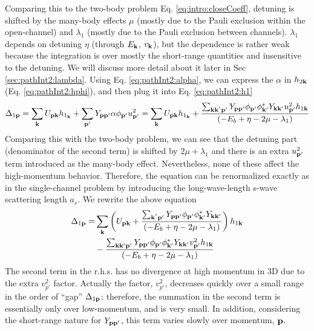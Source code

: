 Comparing this to the two-body problem Eq. \ref{eq:intro:closeCoeff}, detuning is shifted by the many-body effects $\mu$ (mostly due to the Pauli exclusion within the open-channel) and $\lambda_{1}$ (mostly due to the Pauli exclusion between channels). 
$\lambda_{1}$ depends on detuning $\eta$ (through $E_{\mathbf{k}}$, $v_{\mathbf{k}}$), but the dependence is rather weak because the integration is over mostly the short-range quantities and  insensitive to the detuning. We will discuss more detail about it later in Sec \ref{sec:pathInt2:lambda}. 
Using Eq. \ref{eq:pathInt2:alpha}, we can express the $\alpha$ in $h_{2\mathbf{k}}$ (Eq. \ref{eq:pathInt2:hphi}), and then plug it into Eq. \ref{eq:pathInt2:h1}
\begin{equation*}
\Delta_{1\mathbf{p}}=\sum_{\mathbf{k}}{}U_{\mathbf{p}\mathbf{k}}{h_{1_{\mathbf{k}}}}+
	{\sum_{\mathbf{p}'} Y_{\mathbf{p}\mathbf{p}'}\alpha{\phi_{\ensuremath{\mathbf{p}}'}}u_{\mathbf{p}'}^{2}}
				=\sum_{\mathbf{k}}{}U_{\mathbf{p}\mathbf{k}}{h_{1_{\mathbf{k}}}}+
	\frac{\sum_{\mathbf{k}\mathbf{k}^{'}\mathbf{p}'} Y_{\mathbf{p}\mathbf{p}'}{\phi_{\mathbf{p}'}}{\phi_{\mathbf{k}'}^{*}}{Y_{\mathbf{k}\mathbf{k}'}}u_{\mathbf{p}'}^{2}{{h_{1\mathbf{k}}}}}
		{\left(-E_{b}+\eta-2\mu-\lambda_{1}\right)}
\end{equation*}
Comparing this with the two-body problem, we can see that the detuning part (denominator of the second term) is shifted by $2\mu+\lambda_{1}$ and there is an extra $u_{\mathbf{p}'}^{2}$ term introduced as the many-body effect.  Nevertheless, none of these affect the high-momentum behavior. Therefore, the equation can be renormalized exactly as in the single-channel problem by introducing the long-wave-length s-wave scattering length $a_{s}$.  We rewrite the above equation
\begin{equation*}
\begin{split}
\Delta_{1\mathbf{p}}=&\sum_{\mathbf{k}}\left(U_{\mathbf{p}\mathbf{k}}+
	\frac{\sum_{\mathbf{k}^{'}\mathbf{p}'} Y_{\mathbf{p}\mathbf{p}'}{\phi_{\mathbf{p}'}}{\phi_{\mathbf{k}'}^{*}}{Y_{\mathbf{k}\mathbf{k}'}}}
		{\left(-E_{b}+\eta-2\mu-\lambda_{1}\right)}\right){{h_{1\mathbf{k}}}}\\
	&-\frac{\sum_{\mathbf{k}\mathbf{k}{'}\mathbf{p}'} Y_{\mathbf{p}\mathbf{p}'}{\phi_{\mathbf{p}'}}{\phi_{\mathbf{k}'}^{*}}{Y_{\mathbf{k}\mathbf{k}'}}v_{\mathbf{p}'}^{2}{h_{1\mathbf{k}}}}
		{\left(-E_{b}+\eta-2\mu-\lambda_{1}\right)}{}
\end{split}
\end{equation*}
The second term in the r.h.s. has no divergence at high momentum in 3D due to the extra $v_{p'}^{2}$ factor. Actually the factor, $v_{p'}^{2}$, decreases quickly over a small range in the order of  ``gap'' $\Delta_{1\mathbf{p}}$; therefore, the summation in the second term is essentially only over low-momentum, and is very small.   In addition, considering the short-range nature for $Y_{\mathbf{p}\mathbf{p}'}$, this term varies slowly over momentum, $\mathbf{p}$.  

